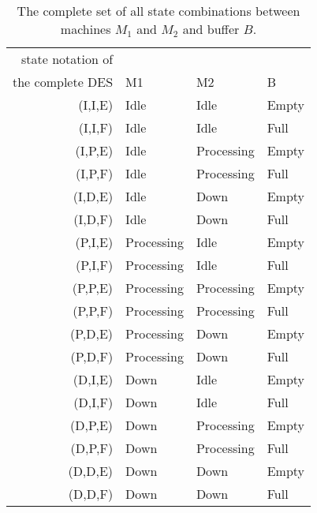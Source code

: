 \begin{table}[H]\centering
    \begin{tabular}{r|lll}
    state notation of \\ the complete DES & M1         & M2         & B     \\ \hline
    (I,I,E)                            & Idle       & Idle       & Empty \\
    (I,I,F)                            & Idle       & Idle       & Full  \\
    (I,P,E)                            & Idle       & Processing & Empty \\
    (I,P,F)                            & Idle       & Processing & Full  \\
    (I,D,E)                            & Idle       & Down       & Empty \\
    (I,D,F)                            & Idle       & Down       & Full  \\
    (P,I,E)                            & Processing & Idle       & Empty \\
    (P,I,F)                            & Processing & Idle       & Full  \\
    (P,P,E)                            & Processing & Processing & Empty \\
    (P,P,F)                            & Processing & Processing & Full  \\
    (P,D,E)                            & Processing & Down       & Empty \\
    (P,D,F)                            & Processing & Down       & Full  \\
    (D,I,E)                            & Down       & Idle       & Empty \\
    (D,I,F)                            & Down       & Idle       & Full  \\
    (D,P,E)                            & Down       & Processing & Empty \\
    (D,P,F)                            & Down       & Processing & Full  \\
    (D,D,E)                            & Down       & Down       & Empty \\
    (D,D,F)                            & Down       & Down       & Full  \\
    \end{tabular}
    \caption{The complete set of all state combinations between machines $M_1$
      and $M_2$ and buffer $B$.}
    \label{tbl:04.02_all_states}
\end{table}
